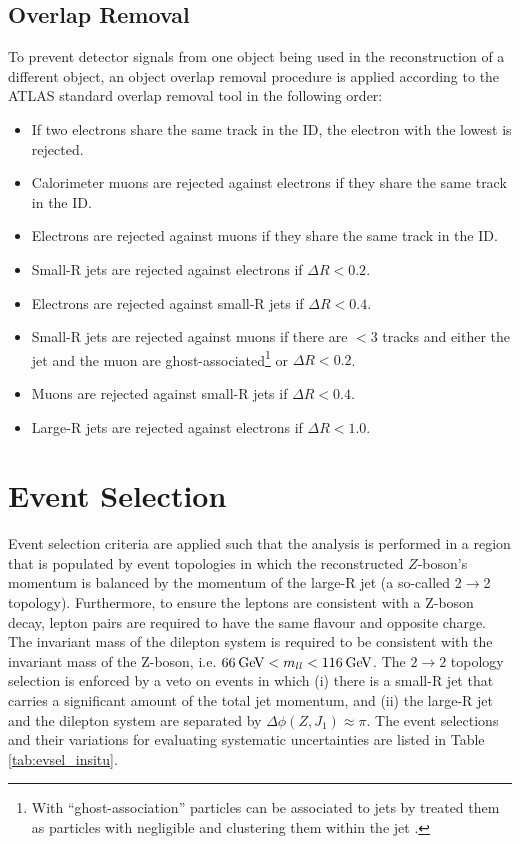 \subsection{Overlap Removal}\label{sec:insitu:or}
To prevent detector signals from one object being used in the reconstruction of a different object, an object overlap removal procedure is applied according to the ATLAS standard overlap removal tool \cite{ORTool} in the following order:
\begin{itemize}
    \item If two electrons share the same track in the ID, the electron with the lowest \pt is rejected.
    \item Calorimeter muons are rejected against electrons if they share the same track in the ID.
    \item Electrons are rejected against muons if they share the same track in the ID.
    \item Small-R jets are rejected against electrons if $\Delta R<0.2$.
    \item Electrons are rejected against small-R jets if $\Delta R<0.4$.
    \item Small-R jets are rejected against muons if there are $<3$ tracks and either the jet and the muon are ghost-associated\footnote{With ``ghost-association'' particles can be associated to jets by treated them as particles with negligible \pt and clustering them within the jet \cite{Insitu:ghostassociation}.} or $\Delta R<0.2$. 
    \item Muons are rejected against small-R jets if $\Delta R<0.4$.
    \item Large-R jets are rejected against electrons if $\Delta R < 1.0$.
\end{itemize}

\section{Event Selection}
Event selection criteria are applied such that the analysis is performed in a region that is populated by event topologies in which the reconstructed $Z$-boson's momentum is balanced by the momentum of the large-R jet (a so-called 2$\rightarrow$2 topology). Furthermore, to ensure the leptons are consistent with a Z-boson decay, lepton pairs are required to have the same flavour and opposite charge. The invariant mass of the dilepton system is required to be consistent with the invariant mass of the Z-boson, i.e. $66\hspace{2pt}\text{Ge\kern -0.1em V}<m_{ll}<116\hspace{2pt}\text{Ge\kern -0.1em V}$. The $2\rightarrow2$ topology selection is enforced by a veto on events in which (i) there is a small-R jet that carries a significant amount of the total jet momentum, and (ii) the large-R jet and the dilepton system are separated by $\Delta\phi(Z,J_1)\approx\pi$. The event selections and their variations for evaluating systematic uncertainties are listed in Table \ref{tab:evsel_insitu}. 

